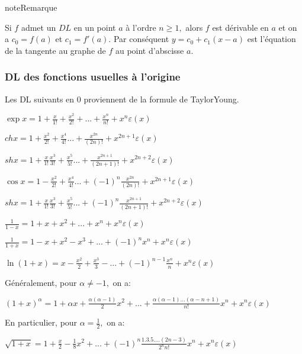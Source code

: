 \documentclass[letterpaper,10pt,french]{jupyterBook}
\begin{document}
\begin{sphinxadmonition}{note}{Remarque}

\sphinxAtStartPar
Si \(f\) admet un \(DL\) en un point \(a\) à l’ordre \(n\geq1,\) alors \(f\) est dérivable en \(a\) et on a \(c_0 = f(a)\) et \(c_1 = f'(a).\) Par
conséquent \(y = c_0 + c_1(x-a)\) est l’équation de la tangente au graphe de \(f\) au point d’abscisse \(a.\)
\end{sphinxadmonition}


\subsubsection{DL des fonctions usuelles à l’origine}
\label{\detokenize{dl:dl-des-fonctions-usuelles-a-l-origine}}
\sphinxAtStartPar
Les DL suivants en \(0\) proviennent de la formule de Taylor\sphinxhyphen{}Young.

\sphinxAtStartPar
\(\exp x=1+\frac{x}{1!}+\frac{x^2}{2!}+...+\frac{x^n}{n!}+x^n \varepsilon(x)\)

\sphinxAtStartPar
\(chx=1+\frac{x^2}{2!}+\frac{x^4}{4!}...+\frac{x^{2n}}{(2n)!}+x^{2n+1} \varepsilon(x)\)

\sphinxAtStartPar
\(shx=1+\frac{x}{1!}\frac{x^3}{3!}+\frac{x^5}{5!}...+\frac{x^{2n+1}}{(2n+1)!}+x^{2n+2} \varepsilon(x)\)

\sphinxAtStartPar
\(\cos x=1-\frac{x^2}{2!}+\frac{x^4}{4!}...+(-1)^n\frac{x^{2n}}{(2n)!}+x^{2n+1} \varepsilon(x)\)

\sphinxAtStartPar
\(shx=1+\frac{x}{1!}\frac{x^3}{3!}+\frac{x^5}{5!}...+(-1)^n\frac{x^{2n+1}}{(2n+1)!}+x^{2n+2} \varepsilon(x)\)

\sphinxAtStartPar
\(\frac{1}{1-x}=1+x+x^2+...+x^n+x^n \varepsilon(x)\)

\sphinxAtStartPar
\(\frac{1}{1+x}=1-x+x^2-x^3+...+(-1)^n x^n+x^n \varepsilon(x)\)

\sphinxAtStartPar
\(\ln(1+x)=x-\frac{x^2}{2}+\frac{x^3}{3}-...+(-1)^{n-1} \frac{x^n}{n}+x^n \varepsilon(x)\)

\sphinxAtStartPar
Généralement, pour \(\alpha\neq -1,\) on a:

\sphinxAtStartPar
\((1+x)^{\alpha}=1+\alpha x+\frac{\alpha(\alpha-1)}{2}x^2+...+\frac{\alpha(\alpha-1)...(\alpha-n+1)}{n!}x^n+x^{n} \varepsilon(x)\)

\sphinxAtStartPar
En particulier, pour \(\alpha=\frac{1}{2},\) on a:

\sphinxAtStartPar
\(\sqrt{1+x}=1+\frac{x}{2}-\frac{1}{8}x^2+...+(-1)^n\frac{1.3.5....(2n-3)}{2^n n!}x^n+x^n \varepsilon(x)\)
\end{document}
